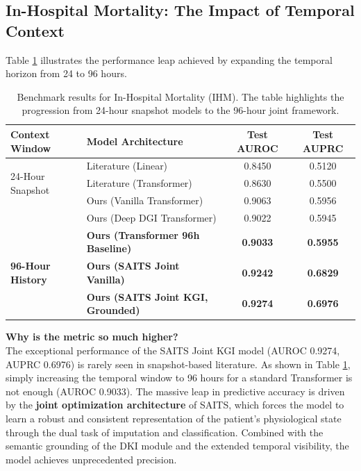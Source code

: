 \subsection{In-Hospital Mortality: The Impact of Temporal Context}

Table \ref{tab:sepsis_ihm_benchmark} illustrates the performance leap achieved by expanding the temporal horizon from 24 to 96 hours. 

\begin{table}[ht]
\centering
\caption{Benchmark results for In-Hospital Mortality (IHM). The table highlights the progression from 24-hour snapshot models to the 96-hour joint framework.}
\label{tab:sepsis_ihm_benchmark}
\begin{tabular}{llcc}
\toprule
\textbf{Context Window} & \textbf{Model Architecture} & \textbf{Test AUROC} & \textbf{Test AUPRC} \\
\midrule
\multirow{3}{*}{24-Hour Snapshot} & Literature (Linear) \cite{huang2025} & 0.8450 & 0.5120 \\
 & Literature (Transformer) \cite{huang2025} & 0.8630 & 0.5500 \\
 & Ours (Vanilla Transformer) & 0.9063 & 0.5956 \\
 & Ours (Deep DGI Transformer) & 0.9022 & 0.5945 \\
\midrule
\multirow{3}{*}{\textbf{96-Hour History}} & \textbf{Ours (Transformer 96h Baseline)} & \textbf{0.9033} & \textbf{0.5955} \\
 & \textbf{Ours (SAITS Joint Vanilla)} & \textbf{0.9242} & \textbf{0.6829} \\
 & \textbf{Ours (SAITS Joint KGI, Grounded)} & \textbf{0.9274} & \textbf{0.6976} \\
\bottomrule
\end{tabular}
\end{table}

\textbf{Why is the metric so much higher?}\\
The exceptional performance of the SAITS Joint KGI model (AUROC 0.9274, AUPRC 0.6976) is rarely seen in snapshot-based literature. As shown in Table \ref{tab:sepsis_ihm_benchmark}, simply increasing the temporal window to 96 hours for a standard Transformer is not enough (AUROC 0.9033). The massive leap in predictive accuracy is driven by the \textbf{joint optimization architecture} of SAITS, which forces the model to learn a robust and consistent representation of the patient's physiological state through the dual task of imputation and classification. Combined with the semantic grounding of the DKI module and the extended temporal visibility, the model achieves unprecedented precision.

